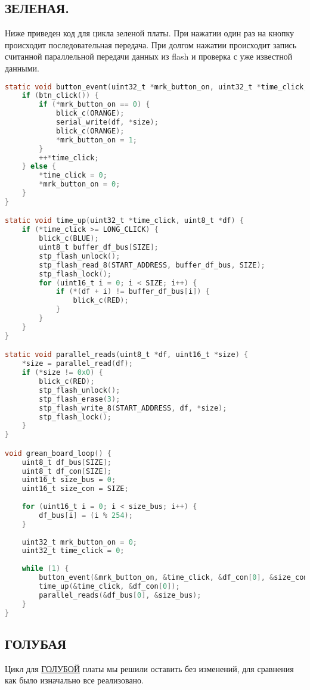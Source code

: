 \documentclass{bmstu}
\begin{document}
	\subsection{ЗЕЛЕНАЯ.}
	
	Ниже приведен код для цикла зеленой платы. При нажатии один раз на кнопку происходит последовательная передача. При долгом нажатии происходит запись считанной параллельной передачи данных из flash и проверка с уже известной данными.
	
	\begingroup
	\fontsize{12pt}{12pt}\selectfont
	\begin{lstlisting}[language=C]
static void button_event(uint32_t *mrk_button_on, uint32_t *time_click, uint8_t *df, uint16_t *size) {
	if (btn_click()) {
		if (*mrk_button_on == 0) {
			blick_c(ORANGE);
			serial_write(df, *size);
			blick_c(ORANGE);
			*mrk_button_on = 1;
		}
		++*time_click;
	} else {
		*time_click = 0;
		*mrk_button_on = 0;
	}
}

static void time_up(uint32_t *time_click, uint8_t *df) {
	if (*time_click >= LONG_CLICK) {
		blick_c(BLUE);
		uint8_t buffer_df_bus[SIZE];
		stp_flash_unlock();
		stp_flash_read_8(START_ADDRESS, buffer_df_bus, SIZE);
		stp_flash_lock();
		for (uint16_t i = 0; i < SIZE; i++) {
			if (*(df + i) != buffer_df_bus[i]) {
				blick_c(RED); 
			}
		}
	}
}

static void parallel_reads(uint8_t *df, uint16_t *size) {
	*size = parallel_read(df);
	if (*size != 0x0) {
		blick_c(RED);
		stp_flash_unlock();
		stp_flash_erase(3);
		stp_flash_write_8(START_ADDRESS, df, *size);
		stp_flash_lock();
	} 
}

void grean_board_loop() {
	uint8_t df_bus[SIZE];
	uint8_t df_con[SIZE];
	uint16_t size_bus = 0;
	uint16_t size_con = SIZE;
	
	for (uint16_t i = 0; i < size_bus; i++) {
		df_bus[i] = (i % 254);
	}
	
	uint32_t mrk_button_on = 0;
	uint32_t time_click = 0;
	
	while (1) {
		button_event(&mrk_button_on, &time_click, &df_con[0], &size_con);
		time_up(&time_click, &df_con[0]);
		parallel_reads(&df_bus[0], &size_bus);
	}
}
	\end{lstlisting}
	\endgroup
	
	\subsection{ГОЛУБАЯ}
	
	Цикл для \underline{ГОЛУБОЙ} платы мы решили оставить без изменений, для сравнения как было изначально все реализовано.
	
\end{document}
